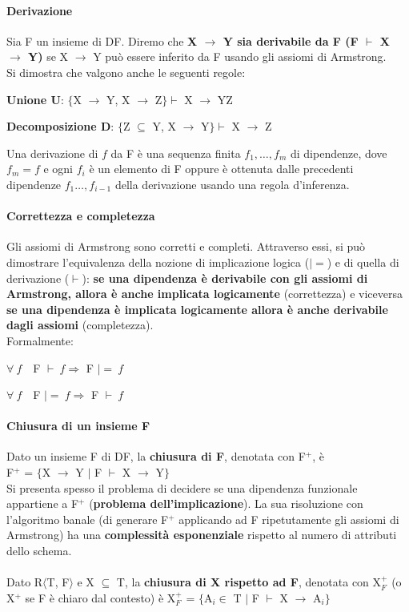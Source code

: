 \documentclass[10pt]{book}
\begin{document}
\paragraph{Derivazione} Sia F un insieme di DF. Diremo che \textbf{X $\rightarrow$ Y sia derivabile da F (F $\vdash$ X $\rightarrow$ Y)} se X $\rightarrow$ Y può essere inferito da F usando gli assiomi di Armstrong.\\
Si dimostra che valgono anche le seguenti regole:
\begin{list}{}{}
	\item \textbf{Unione U}: $\{$X $\rightarrow$ Y, X $\rightarrow$ Z$\}\vdash$ X $\rightarrow$ YZ
	\item \textbf{Decomposizione D}: $\{$Z $\subseteq$ Y, X $\rightarrow$ Y$\}\vdash$ X $\rightarrow$ Z
\end{list}
Una derivazione di $f$ da F è una sequenza finita $f_1,\ldots,f_m$ di dipendenze, dove $f_m = f$ e ogni $f_i$ è un elemento di F oppure è ottenuta dalle precedenti dipendenze $f_1\ldots,f_{i-1}$ della derivazione usando una regola d'inferenza.
\paragraph{Correttezza e completezza} Gli assiomi di Armstrong sono corretti e completi. Attraverso essi, si può dimostrare l'equivalenza della nozione di implicazione logica ($|=$) e di quella di derivazione ($\vdash$): \textbf{se una dipendenza è derivabile con gli assiomi di Armstrong, allora è anche implicata logicamente} (correttezza) e viceversa \textbf{se una dipendenza è implicata logicamente allora è anche derivabile dagli assiomi} (completezza).\\
Formalmente:
\begin{list}{}{}
	\item $\forall\:f\:\:\:$ F $\vdash\:f\Rightarrow$ F $|=\:f$
	\item $\forall\:f\:\:\:$ F $|=\:f\Rightarrow$ F $\vdash\:f$
\end{list}
\paragraph{Chiusura di un insieme F} Dato un insieme F di DF, la \textbf{chiusura di F}, denotata con F$^+$, è\\F$^+$ = $\{$X $\rightarrow$ Y $|$ F $\vdash$ X $\rightarrow$ Y$\}$\\
Si presenta spesso il problema di decidere se una dipendenza funzionale appartiene a F$^+$ (\textbf{problema dell'implicazione}). La sua risoluzione con l'algoritmo banale (di generare F$^+$ applicando ad F ripetutamente gli assiomi di Armstrong) ha una \textbf{complessità esponenziale} rispetto al numero di attributi dello schema.\\\\
Dato R$\langle$T, F$\rangle$ e X $\subseteq$ T, la \textbf{chiusura di X rispetto ad F}, denotata con X$_F^+$ (o X$^+$ se F è chiaro dal contesto) è X$_F^+$ = $\{$A$_i\in$ T $|$ F $\vdash$ X $\rightarrow$ A$_i\}$
\end{document}
